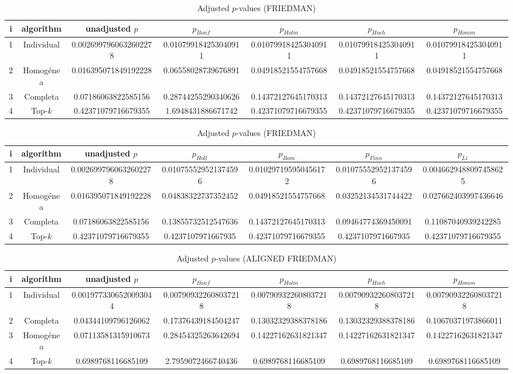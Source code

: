 \documentclass[a4paper,10pt]{article}
\begin{document}
\begin{landscape}
\begin{table}[!htp]
\centering\scriptsize
\caption{Adjusted $p$-values (FRIEDMAN)}
\begin{tabular}{ccccccc}
i&algorithm&unadjusted $p$&$p_{Bonf}$&$p_{Holm}$&$p_{Hoch}$&$p_{Homm}$\\
\hline
1&Individual&0.0026997960632602278&0.010799184253040911&0.010799184253040911&0.010799184253040911&0.010799184253040911\\
2&Homogénea&0.016395071849192228&0.06558028739676891&0.04918521554757668&0.04918521554757668&0.04918521554757668\\
3&Completa&0.07186063822585156&0.28744255290340626&0.14372127645170313&0.14372127645170313&0.14372127645170313\\
4&Top-$k$&0.42371079716679355&1.6948431886671742&0.42371079716679355&0.42371079716679355&0.42371079716679355\\
\hline
\end{tabular}
\end{table}

\begin{table}[!htp]
\centering\scriptsize
\caption{Adjusted $p$-values (FRIEDMAN)}
\begin{tabular}{ccccccc}
i&algorithm&unadjusted $p$&$p_{Holl}$&$p_{Rom}$&$p_{Finn}$&$p_{Li}$\\
\hline
1&Individual&0.0026997960632602278&0.010755529521374596&0.010297195950456172&0.010755529521374596&0.0046629488097458625\\
2&Homogénea&0.016395071849192228&0.04838322737352452&0.04918521554757668&0.03252134531744422&0.027662403997436646\\
3&Completa&0.07186063822585156&0.13855732512547636&0.14372127645170313&0.09464774369450091&0.11087040939242285\\
4&Top-$k$&0.42371079716679355&0.4237107971667935&0.42371079716679355&0.4237107971667935&0.42371079716679355\\
\hline
\end{tabular}
\end{table}


\newpage

\begin{table}[!htp]
\centering\scriptsize
\caption{Adjusted $p$-values (ALIGNED FRIEDMAN)}
\begin{tabular}{ccccccc}
i&algorithm&unadjusted $p$&$p_{Bonf}$&$p_{Holm}$&$p_{Hoch}$&$p_{Homm}$\\
\hline
1&Individual&0.0019773306520093044&0.007909322608037218&0.007909322608037218&0.007909322608037218&0.007909322608037218\\
2&Completa&0.04344109796126062&0.17376439184504247&0.13032329388378186&0.13032329388378186&0.10670371973866011\\
3&Homogénea&0.07113581315910673&0.28454325263642694&0.14227162631821347&0.14227162631821347&0.14227162631821347\\
4&Top-$k$&0.6989768116685109&2.7959072466740436&0.6989768116685109&0.6989768116685109&0.6989768116685109\\
\hline
\end{tabular}
\end{table}


\end{landscape}
\end{document}
